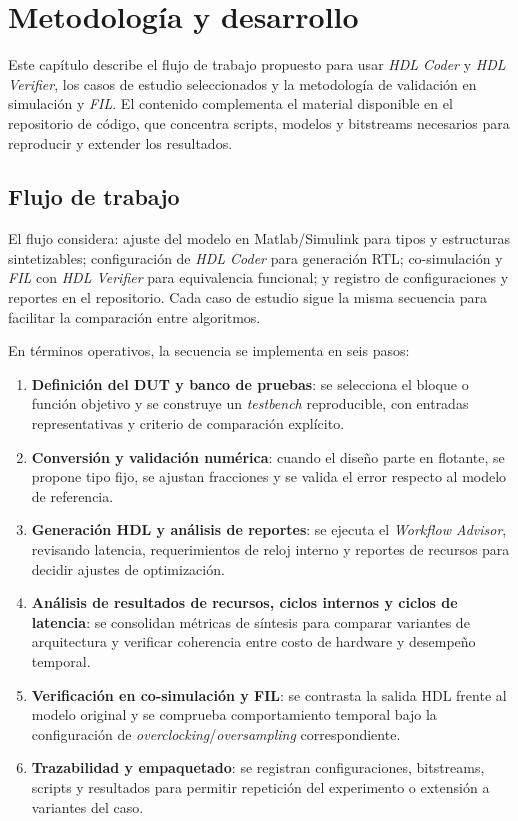 \chapter{Metodología y desarrollo}

Este capítulo describe el flujo de trabajo propuesto para usar \textit{HDL Coder} y \textit{HDL Verifier}, los casos de estudio seleccionados y la metodología de validación en simulación y \textit{FIL}. El contenido complementa el material disponible en el repositorio de código, que concentra scripts, modelos y bitstreams necesarios para reproducir y extender los resultados.

\section{Flujo de trabajo}

El flujo considera: ajuste del modelo en Matlab/Simulink para tipos y estructuras sintetizables; configuración de \textit{HDL Coder} para generación RTL; co-simulación y \textit{FIL} con \textit{HDL Verifier} para equivalencia funcional; y registro de configuraciones y reportes en el repositorio. Cada caso de estudio sigue la misma secuencia para facilitar la comparación entre algoritmos.

En términos operativos, la secuencia se implementa en seis pasos:
\begin{enumerate}
    \item \textbf{Definición del DUT y banco de pruebas}: se selecciona el bloque o función objetivo y se construye un \textit{testbench} reproducible, con entradas representativas y criterio de comparación explícito.
    \item \textbf{Conversión y validación numérica}: cuando el diseño parte en flotante, se propone tipo fijo, se ajustan fracciones y se valida el error respecto al modelo de referencia.
    \item \textbf{Generación HDL y análisis de reportes}: se ejecuta el \textit{Workflow Advisor}, revisando latencia, requerimientos de reloj interno y reportes de recursos para decidir ajustes de optimización.
    \item \textbf{Análisis de resultados de recursos, ciclos internos y ciclos de latencia}: se consolidan métricas de síntesis para comparar variantes de arquitectura y verificar coherencia entre costo de hardware y desempeño temporal.
    \item \textbf{Verificación en co-simulación y FIL}: se contrasta la salida HDL frente al modelo original y se comprueba comportamiento temporal bajo la configuración de \textit{overclocking}/\textit{oversampling} correspondiente.
    \item \textbf{Trazabilidad y empaquetado}: se registran configuraciones, bitstreams, scripts y resultados para permitir repetición del experimento o extensión a variantes del caso.
\end{enumerate}

